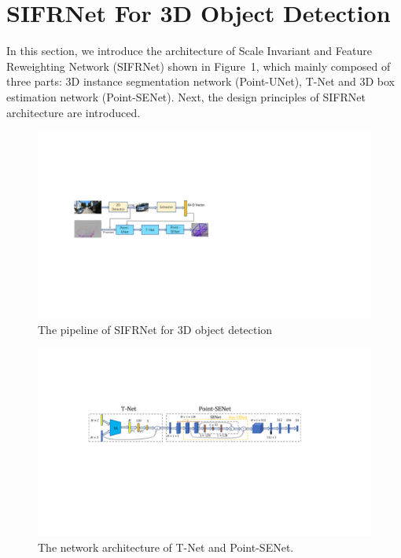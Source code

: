 \documentclass[letterpaper]{article}
\begin{document}
\section{SIFRNet For 3D Object Detection}
In this section, we introduce the architecture of Scale Invariant and Feature Reweighting Network (SIFRNet) shown in Figure~1, which mainly composed of three parts: 3D instance segmentation network (Point-UNet), T-Net and 3D box estimation network (Point-SENet). Next, the design principles of SIFRNet architecture are introduced.


\begin{figure}[t]
\begin{center}
  \includegraphics[width=0.95\linewidth]{full_arch_ok.pdf}
\end{center}
\caption{The pipeline of SIFRNet for 3D object detection}
\label{fig:The pipeline of SIFRNet for 3D object detection}%
\end{figure}

\begin{figure}[htp]
\begin{center}
  \includegraphics[width=0.95\linewidth]{t-NET_3dBOX_Ok.pdf}
\end{center}
\caption{The network architecture of T-Net and Point-SENet.}
\end{figure}
\end{document}
